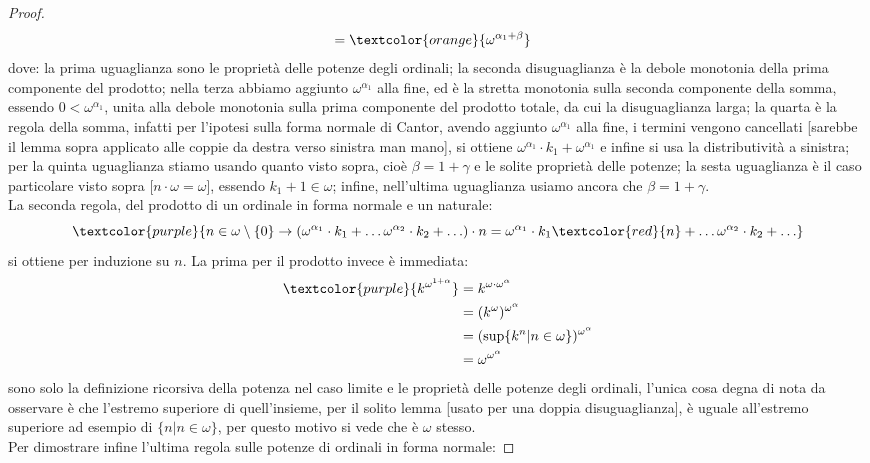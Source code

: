 \documentclass[11pt]{scrartcl}
\begin{document}
\begin{proof}
\[\begin{split}
								  &= \textcolor{orange}{\omega^{\alpha_1 + \beta}}
 	\end{split}
		\]
	dove: la prima uguaglianza sono le proprietà delle potenze degli ordinali; la seconda disuguaglianza è la debole monotonia della prima componente del prodotto; nella terza abbiamo aggiunto $\omega^{\alpha_1}$ alla fine,
	ed è la stretta monotonia sulla seconda componente della somma, essendo $0 < \omega^{\alpha_1}$, unita alla debole monotonia sulla prima componente del prodotto totale, da cui la disuguaglianza larga; la quarta è la regola della somma, infatti per l'ipotesi sulla forma normale di Cantor,
	avendo aggiunto $\omega^{\alpha_1}$ alla fine, i termini vengono cancellati [sarebbe il lemma sopra applicato alle coppie da destra verso sinistra man mano], si ottiene $\omega^{\alpha_1} \cdot k_1 + \omega^{\alpha_1}$ e infine si usa la distributività a sinistra;
	per la quinta uguaglianza stiamo usando quanto visto sopra, cioè $\beta = 1 + \gamma$ e le solite proprietà delle potenze; la sesta uguaglianza è il caso particolare visto sopra [$n \cdot \omega = \omega$], essendo $k_1 + 1 \in \omega$; infine, nell'ultima uguaglianza usiamo ancora che $\beta = 1 + \gamma$.\\
	La seconda regola, del prodotto di un ordinale in forma normale e un naturale:
	\[ \textcolor{purple}{n \in \omega\setminus\{0\} \rightarrow (\omega^{\alpha_1} \cdot k_1 + \ldots \omega^{\alpha_2} \cdot k_2 + \ldots) \cdot n = \omega^{\alpha_1} \cdot k_1\textcolor{red}{n} + \ldots \omega^{\alpha_2} \cdot k_2 + \ldots}
		\]
	si ottiene per induzione su $n$. La prima per il prodotto invece è immediata:
	\[ \begin{split}
		\textcolor{purple}{k^{\omega^{1+\alpha}}} &= k^{\omega \cdot \omega^{\alpha}} \\
												  &= (k^{\omega})^{\omega^{\alpha}} \\
												  &= (\sup\{k^{n} | n \in \omega\})^{\omega^{\alpha}} \\
												  &= \omega^{\omega^{\alpha}}
		\end{split}
		\]
	sono solo la definizione ricorsiva della potenza nel caso limite e le proprietà delle potenze degli ordinali, l'unica cosa degna di nota da osservare è che l'estremo superiore di quell'insieme, 
	per il solito lemma [usato per una doppia disuguaglianza], è uguale all'estremo superiore ad esempio di $\{n | n \in \omega\}$, per questo motivo si vede che è $\omega$ stesso.\\
	Per dimostrare infine l'ultima regola sulle potenze di ordinali in forma normale:

\end{proof}
\end{document}
